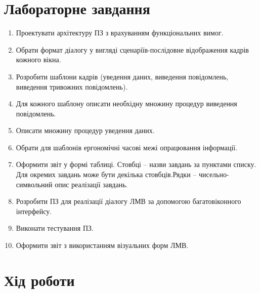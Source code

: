 \documentclass[14pt]{extreport}
\begin{document}
\begin{normalsize}
  \section*{Лабораторне завдання}
  \begin{enumerate}
  	\item Проектувати архітектуру ПЗ з врахуванням функціональних вимог.
  \item Обрати формат діалогу у вигляді сценаріїв-послідовне відображення
кадрів кожного вікна.
  \item Розробити шаблони кадрів (уведення даних, виведення повідомлень,
виведення тривожних повідомлень).
  \item Для кожного шаблону описати необхідну множину процедур
виведення повідомлень.
  \item Описати множину процедур уведення даних.
  \item Обрати для шаблонів ергономічні часові межі опрацювання інформації.
  \item Оформити звіт у формі таблиці. Стовбці – назви завдань за пунктами списку. Для окремих завдань може бути декілька стовбців.Рядки – чисельно-символьний опис реалізації завдань.
  \item Розробити ПЗ для реалізації діалогу ЛМВ за допомогою багатовіконного інтерфейсу.
  \item Виконати тестування ПЗ.
  \item Оформити звіт з використанням візуальних форм ЛМВ.
  \end{enumerate}
  
  \section*{Хід роботи}
  

  \renewcommand{\tablename}{Таблиця}
  \renewcommand{\thetable}{\arabic{table}}
  \captionsetup{justification=raggedleft, singlelinecheck=false, labelsep=period}


\end{normalsize}
\end{document}
